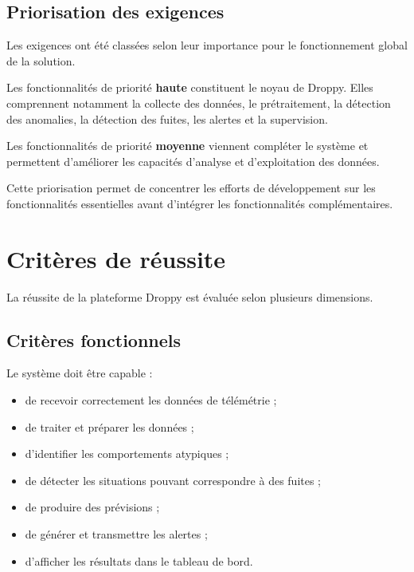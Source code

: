 \subsection{Priorisation des exigences}

Les exigences ont été classées selon leur importance pour le fonctionnement
global de la solution.

Les fonctionnalités de priorité \textbf{haute} constituent le noyau de
Droppy. Elles comprennent notamment la collecte des données, le
prétraitement, la détection des anomalies, la détection des fuites, les
alertes et la supervision.

Les fonctionnalités de priorité \textbf{moyenne} viennent compléter le
système et permettent d'améliorer les capacités d'analyse et d'exploitation
des données.

Cette priorisation permet de concentrer les efforts de développement sur
les fonctionnalités essentielles avant d'intégrer les fonctionnalités
complémentaires.


\section{Critères de réussite}

La réussite de la plateforme Droppy est évaluée selon plusieurs dimensions.

\subsection{Critères fonctionnels}

Le système doit être capable :

\begin{itemize}

    \item de recevoir correctement les données de télémétrie ;

    \item de traiter et préparer les données ;

    \item d'identifier les comportements atypiques ;

    \item de détecter les situations pouvant correspondre à des fuites ;

    \item de produire des prévisions ;

    \item de générer et transmettre les alertes ;

    \item d'afficher les résultats dans le tableau de bord.

\end{itemize}

